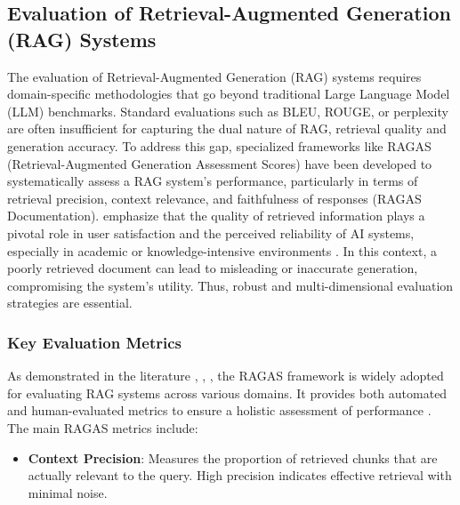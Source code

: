 \begin{refsection}
\subsection{Evaluation of Retrieval-Augmented Generation (RAG) Systems}

\hspace{0.4cm}The evaluation of Retrieval-Augmented Generation (RAG) systems requires domain-specific methodologies that go beyond traditional Large Language Model (LLM) benchmarks. Standard evaluations such as BLEU, ROUGE, or perplexity are often insufficient for capturing the dual nature of RAG, retrieval quality and generation accuracy. To address this gap, specialized frameworks like RAGAS (Retrieval-Augmented Generation Assessment Scores) have been developed to systematically assess a RAG system's performance, particularly in terms of retrieval precision, context relevance, and faithfulness of responses (RAGAS Documentation). \citeauthor{shuster2021retrieval} \citeyear{shuster2021retrieval} emphasize that the quality of retrieved information plays a pivotal role in user satisfaction and the perceived reliability of AI systems, especially in academic or knowledge-intensive environments \cite{shuster2021retrieval}. In this context, a poorly retrieved document can lead to misleading or inaccurate generation, compromising the system's utility. Thus, robust and multi-dimensional evaluation strategies are essential.

\subsubsection{Key Evaluation Metrics}
\hspace{0.4cm}As demonstrated in the literature \citeauthor{roychowdhury2024evaluation} \citeyear{roychowdhury2024evaluation}, \citeauthor{aquino2024extracting} \citeyear{aquino2024extracting}, \citeauthor{deepak2025langchain}  \citeyear{deepak2025langchain}, the RAGAS framework is widely adopted for evaluating RAG systems across various domains. It provides both automated and human-evaluated metrics to ensure a holistic assessment of performance \cite{roychowdhury2024evaluation} \cite{aquino2024extracting} \cite{deepak2025langchain}. The main RAGAS metrics include:
\begin{itemize}
    \item \textbf{Context Precision}:  Measures the proportion of retrieved chunks that are actually relevant to the query. High precision indicates effective retrieval with minimal noise.


\end{itemize}
\end{refsection}
